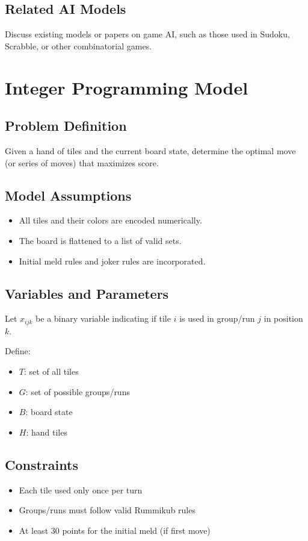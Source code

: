 \documentclass[12pt]{article}
\begin{document}
\subsection{Related AI Models}
Discuss existing models or papers on game AI, such as those used in Sudoku, Scrabble, or other combinatorial games.

\section{Integer Programming Model}
\subsection{Problem Definition}
Given a hand of tiles and the current board state, determine the optimal move (or series of moves) that maximizes score.

\subsection{Model Assumptions}
\begin{itemize}
    \item All tiles and their colors are encoded numerically.
    \item The board is flattened to a list of valid sets.
    \item Initial meld rules and joker rules are incorporated.
\end{itemize}

\subsection{Variables and Parameters}
Let $x_{ijk}$ be a binary variable indicating if tile $i$ is used in group/run $j$ in position $k$.

Define:
\begin{itemize}
    \item $T$: set of all tiles
    \item $G$: set of possible groups/runs
    \item $B$: board state
    \item $H$: hand tiles
\end{itemize}

\subsection{Constraints}
\begin{itemize}
    \item Each tile used only once per turn
    \item Groups/runs must follow valid Rummikub rules
    \item At least 30 points for the initial meld (if first move)
\end{itemize}
\end{document}
